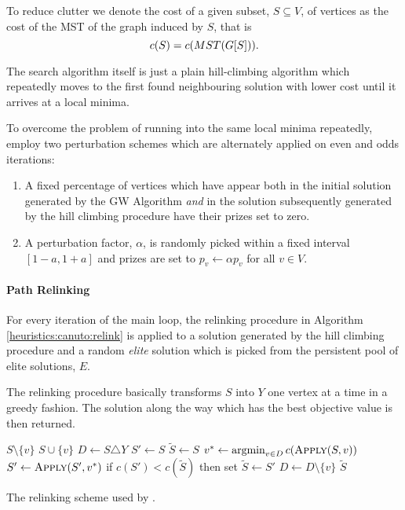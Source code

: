 To reduce clutter we denote the cost
of a given subset, $S \subseteq V$, of vertices as the cost
of the MST of the graph induced by $S$, that is
\[c(S) = c(MST(G[S]))\mathnormal{.}\]

The search algorithm itself is just a plain hill-climbing algorithm which repeatedly
 moves to the first
 found neighbouring solution with lower cost until it arrives at a local minima.

 To overcome the problem of running into the same local minima repeatedly,
 \citet{canuto2001local} employ two perturbation schemes which are alternately applied
 on even and odds iterations:
 \begin{enumerate}
 \item A fixed percentage of vertices which have appear both in the initial solution generated
   by the GW Algorithm \textit{and}  in the solution subsequently generated by
    the hill climbing procedure have their prizes
    set to zero.
  \item A perturbation factor, $\alpha$, is randomly picked within a fixed interval $[1 -a, 1+a]$
    and prizes are set to $p_v \gets \alpha p_v$ for all $v \in V$.
 \end{enumerate}

\paragraph{Path Relinking}
For every iteration of the main loop, the relinking procedure in Algorithm \ref{heuristics:canuto:relink}
is applied to a solution generated by the hill climbing procedure and 
a random \textit{elite} solution which is picked from the
persistent pool of elite solutions, $E$.

The relinking procedure basically transforms $S$ into $Y$ one vertex at a time in a greedy fashion.
The solution along the way which has the best objective value is then returned.
 \begin{algorithm}[h!]
   \begin{algorithmic}[1]
     \State \Return $S \setminus \{v\}$
     \Else
     \State \Return $S \cup \{v\}$
     \EndIf
     \EndProcedure
     \State $D \gets S \triangle Y$
     \State $S' \gets S$
     \State $\tilde{S} \gets S$
     \State $v^* \gets \argmin_{v \in D} c(\Call{Apply}{S,v})$
     \State $S' \gets \Call{Apply}{S', v^*}$
     \State if $c(S') < c(\tilde{S})$ then set $\tilde{S} \gets S'$
     \State $D \gets D \setminus \{v\}$
     \EndWhile
     \State \Return $\tilde{S}$
     \EndProcedure
 \end{algorithmic}
 \caption{The relinking scheme used by \citet{canuto2001local}.}\label{heuristics:canuto:relink}
 \end{algorithm}

